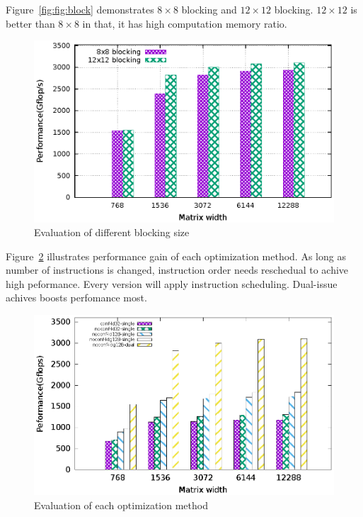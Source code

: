 \documentclass{sig-alternate-05-2015}
\begin{document}
Figure~\ref{fig:fig:block} demonstrates $8\times8$ blocking and $12\times12$ blocking. $12\times12$ is better than
$8\times8$ in that, it has high computation memory ratio.
\begin{figure}[htbp]
\begin{center}
\includegraphics[scale=0.6]{block}
    \caption{Evaluation of different blocking size}
\label{fig:block}
\end{center}
\end{figure}

Figure~\ref{fig:th_prof} illustrates performance gain of each optimization method.
As long as number of instructions is changed, instruction order needs reschedual to achive high peformance.
Every version will apply instruction scheduling.
Dual-issue achives boosts perfomance most.
\begin{figure}[htbp]
\begin{center}
\includegraphics[scale=0.65]{tn_prof}
    \caption{Evaluation of each optimization method}
\label{fig:th_prof}
\end{center}
\end{figure}

%

%
%
\end{document}
